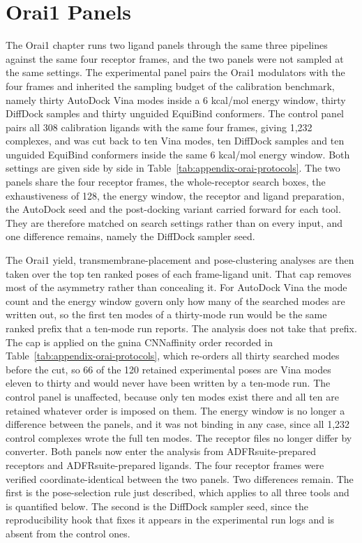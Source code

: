 \hypertarget{orai1-panels}{%
\section{Orai1 Panels}\label{orai1-panels}}

The Orai1 chapter runs two ligand panels through the same three pipelines against the same four receptor frames, and the two panels were not sampled at the same settings. The experimental panel pairs the Orai1 modulators with the four frames and inherited the sampling budget of the calibration benchmark, namely thirty AutoDock Vina modes inside a 6 kcal/mol energy window, thirty DiffDock samples and thirty unguided EquiBind conformers. The control panel pairs all 308 calibration ligands with the same four frames, giving 1,232 complexes, and was cut back to ten Vina modes, ten DiffDock samples and ten unguided EquiBind conformers inside the same 6 kcal/mol energy window. Both settings are given side by side in Table~\ref{tab:appendix-orai-protocols}. The two panels share the four receptor frames, the whole-receptor search boxes, the exhaustiveness of 128, the energy window, the receptor and ligand preparation, the AutoDock seed and the post-docking variant carried forward for each tool. They are therefore matched on search settings rather than on every input, and one difference remains, namely the DiffDock sampler seed.

The Orai1 yield, transmembrane-placement and pose-clustering analyses are then taken over the top ten ranked poses of each frame-ligand unit. That cap removes most of the asymmetry rather than concealing it. For AutoDock Vina the mode count and the energy window govern only how many of the searched modes are written out, so the first ten modes of a thirty-mode run would be the same ranked prefix that a ten-mode run reports. The analysis does not take that prefix. The cap is applied on the gnina CNNaffinity order recorded in Table~\ref{tab:appendix-orai-protocols}, which re-orders all thirty searched modes before the cut, so 66 of the 120 retained experimental poses are Vina modes eleven to thirty and would never have been written by a ten-mode run. The control panel is unaffected, because only ten modes exist there and all ten are retained whatever order is imposed on them. The energy window is no longer a difference between the panels, and it was not binding in any case, since all 1,232 control complexes wrote the full ten modes. The receptor files no longer differ by converter. Both panels now enter the analysis from ADFRsuite-prepared receptors and ADFRsuite-prepared ligands. The four receptor frames were verified coordinate-identical between the two panels. Two differences remain. The first is the pose-selection rule just described, which applies to all three tools and is quantified below. The second is the DiffDock sampler seed, since the reproducibility hook that fixes it appears in the experimental run logs and is absent from the control ones.

